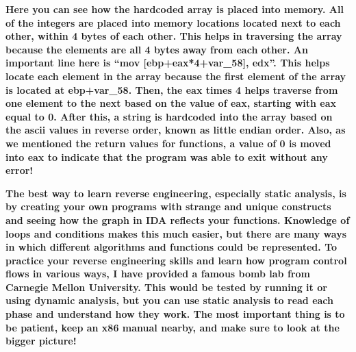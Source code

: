   
 

\textbf{Here you can see how the hardcoded array is placed into memory. All of the integers are placed into memory
locations located next to each other, within 4 bytes of each other. This helps in traversing the array because the
elements are all 4 bytes away from each other. An important line here is ``mov [ebp+eax*4+var\_58], edx''. This helps
locate each element in the array because the first element of the array is located at ebp+var\_58. Then, the eax times
4 helps traverse from one element to the next based on the value of eax, starting with eax equal to 0. After this, a
string is hardcoded into the array based on the ascii values in reverse order, known as little endian order. Also, as
we mentioned the return values for functions, a value of 0 is moved into eax to indicate that the program was able to
exit without any error!}

\textbf{The best way to learn reverse engineering, especially static analysis, is by creating your own programs with
strange and unique constructs and seeing how the graph in IDA reflects your functions. Knowledge of loops and
conditions makes this much easier, but there are many ways in which different algorithms and functions could be
represented. To practice your reverse engineering skills and learn how program control flows in various ways, I have
provided a famous bomb lab from Carnegie Mellon University. This would be tested by running it or using dynamic
analysis, but you can use static analysis to read each phase and understand how they work. The most important thing is
to be patient, keep an x86 manual nearby, and make sure to look at the bigger picture!}
